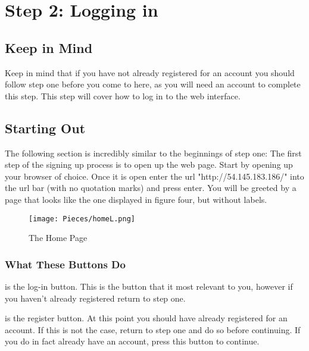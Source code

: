 \chapter{Step 2: Logging in}

\setlength{\parindent}{0cm}

\section{Keep in Mind}
Keep in mind that if you have not already registered for an account you should follow step one before you come to here, as you will need an account to complete this step. This step will cover how to log in to the web interface.

\section{Starting Out}
The following section is incredibly similar to the beginnings of step one:
The first step of the signing up process is to open up the web page. Start by opening up your browser of choice. Once it is open enter the url "http://54.145.183.186/" into the url bar (with no quotation marks) and press enter. You will be greeted by a page that looks like the one displayed in figure four, but without labels.

\begin{figure}[h]
    \caption{The Home Page}
    \texttt{[image: Pieces/homeL.png]}
\end{figure}

\newpage

\subsection{What These Buttons Do}
\begin{enumerate}[{[1]}]
\item is the log-in button. This is the button that it most relevant to you, however if you haven't already registered return to step one.
\item is the register button. At this point you should have already registered for an account. If this is not the case, return to step one and do so before continuing. If you do in fact already have an account, press this button to continue.
\end{enumerate}

